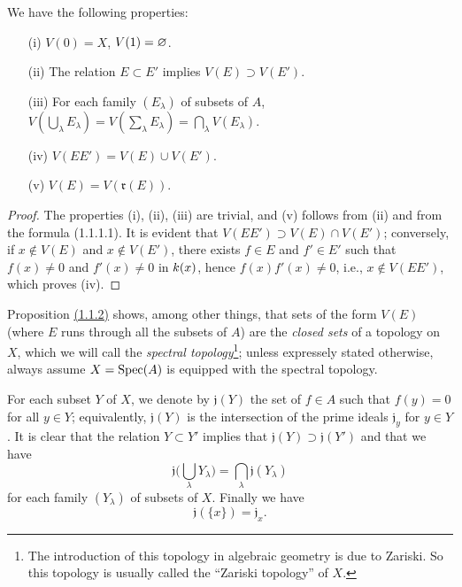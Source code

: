 \begin{prop}[1.1.2]
\label{prop-1.1.1.2}
We have the following properties:
\begin{itemize}
  \item[{\rm(i)}] $V(0)=X$, $V(1)=\varnothing$.
  \item[{\rm(ii)}] The relation $E\subset E'$ implies $V(E)\supset V(E')$.
  \item[{\rm(iii)}] For each family $(E_\lambda)$ of subsets of $A$,
    $V(\bigcup_\lambda E_\lambda)=V(\sum_\lambda E_\lambda)
          =\bigcap_\lambda V(E_\lambda)$.
  \item[{\rm(iv)}] $V(EE')=V(E)\cup V(E')$.
  \item[{\rm(v)}] $V(E)=V(\mathfrak{r}(E))$.
\end{itemize}
\end{prop}

\begin{proof}
\label{proof-prop-1.1.1.2}
The properties (i), (ii), (iii) are trivial, and (v) follows from (ii) and from
the formula (1.1.1.1). It is evident that $V(EE')\supset V(E)\cap V(E')$;
conversely, if $x\not\in V(E)$ and $x\not\in V(E')$, there exists $f\in E$ and
$f'\in E'$ such that $f(x)\neq 0$ and $f'(x)\neq 0$ in $k(x)$, hence
$f(x)f'(x)\neq 0$, i.e., $x\not\in V(EE')$, which proves (iv).
\end{proof}

\begin{rmk}
\label{rmk-prop-1.1.1.2}
Proposition \hyperref[prop-1.1.1.2]{(1.1.2)} shows, among other things, that sets of the form $V(E)$
(where $E$ runs through all the subsets of $A$) are the {\em closed sets} of a topology on
$X$, which we will call the {\em spectral topology}\footnote{The introduction of this
topology in algebraic geometry is due to Zariski. So this topology is usually called
the ``Zariski topology'' of $X$.}; unless expressely stated otherwise, always assume
$X={\mathop{\mathrm{Spec}}\nolimits}(A)$ is equipped with the spectral topology.
\end{rmk}

\begin{env}[1.1.3]
\label{env-1.1.1.3}
For each subset $Y$ of $X$, we denote by $\mathfrak{j}(Y)$ the set of $f\in A$ such that
$f(y)=0$ for all $y\in Y$; equivalently, $\mathfrak{j}(Y)$ is the intersection of the prime
ideals $\mathfrak{j}_y$ for $y\in Y$. It is clear that the relation $Y\subset Y'$ implies
that $\mathfrak{j}(Y)\supset\mathfrak{j}(Y')$ and that we have
\[
  \mathfrak{j}\bigg(\bigcup_\lambda Y_\lambda\bigg)=\bigcap_\lambda\mathfrak{j}(Y_\lambda)
  \tag{1.1.3.1}
\]
for each family $(Y_\lambda)$ of subsets of $X$. Finally we have
\[
  \mathfrak{j}(\{x\})=\mathfrak{j}_x.
  \tag{1.1.3.2}
\]
\end{env}

